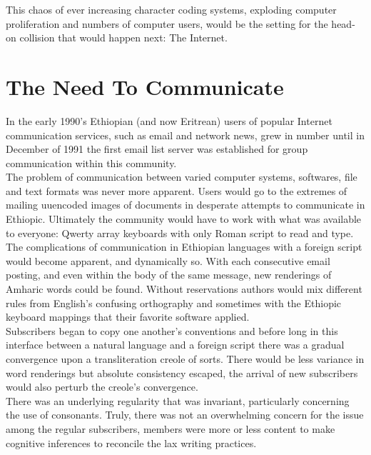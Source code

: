 This chaos of ever increasing character coding systems, exploding computer
proliferation and numbers of computer users, would be the setting for the
head-on collision that would happen next:  The Internet.\\


\section*{The Need To Communicate}
In the early 1990's Ethiopian (and now Eritrean) users of popular Internet
communication services, such as email and network news, grew in number until
in December of 1991 the first email list server was established for group
communication within this community.\\

The problem of communication between varied computer systems, softwares,
file and text formats was never more apparent.  Users would go to the extremes
of mailing uuencoded images of documents in desperate attempts to communicate
in Ethiopic.  Ultimately the community would have to work with what was 
available to everyone:  Qwerty array keyboards with only Roman script to read
and type.\\

The complications of communication in Ethiopian languages with a foreign script
would become apparent, and dynamically so.  With each consecutive email
posting, and even within the body of the same message, new renderings of
Amharic words could be found.  Without reservations authors would mix different
rules from English's confusing orthography and sometimes with the Ethiopic
keyboard mappings that their favorite software applied.\\

Subscribers began to copy one another's conventions and before long in this
interface between a natural language and a foreign script there was a gradual
convergence upon a transliteration creole of sorts.  There would be less
variance in word renderings but absolute consistency escaped, the arrival of
new subscribers would also perturb the creole's convergence.\\

There was an underlying regularity that was invariant, particularly
concerning the use of consonants.  Truly, there was not an overwhelming concern
for the issue among the regular subscribers, members were more or less
content to make cognitive inferences to reconcile the lax writing practices.\\

